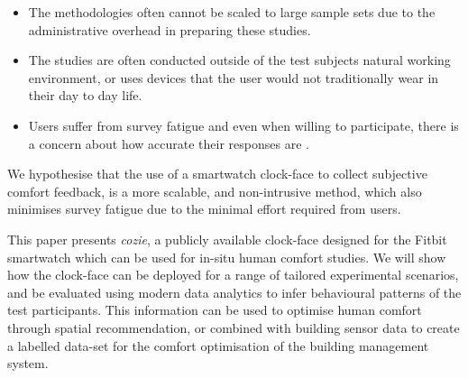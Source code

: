 \begin{itemize}
  \item The methodologies often cannot be scaled to large sample sets due to the administrative overhead in preparing these studies.
  \item The studies are often conducted outside of the test subjects natural working environment, or uses devices that the user would not traditionally wear in their day to day life. 
  \item Users suffer from survey fatigue \cite{porter2004multiple} and even when willing to participate, there is a concern about how accurate their responses are \cite{Clear2018}.
\end{itemize}

We hypothesise that the use of a smartwatch clock-face to collect subjective comfort feedback, is a more scalable, and non-intrusive method, which also minimises survey fatigue due to the minimal effort required from users. 

This paper presents \emph{cozie}, a publicly available clock-face designed for the Fitbit smartwatch which can be used for in-situ human comfort studies. We will show how the clock-face can be deployed for a range of tailored experimental scenarios, and be evaluated using modern data analytics to infer behavioural patterns of the test participants. This information can be used to optimise human comfort through spatial recommendation, or combined with building sensor data to create a labelled data-set for the comfort optimisation of the building management system. 
